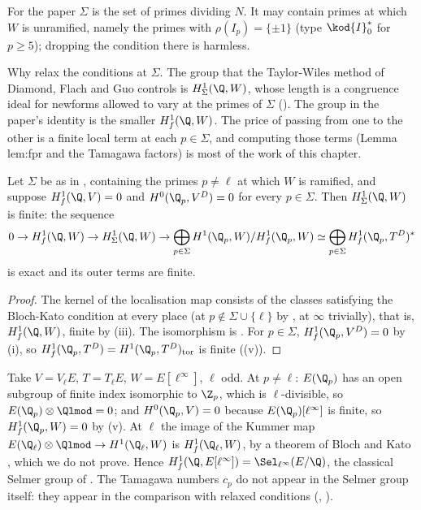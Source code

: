 For the paper $\Sigma$ is the set of primes dividing $N$. It may contain primes at which $W$ is unramified, namely the primes with $\rho(I_p)=\{\pm1\}$ (type
$\kod{I}_0^*$ for $p\ge5$); dropping the condition there is harmless.

Why relax the conditions at $\Sigma$. The group that the Taylor-Wiles method of Diamond, Flach and Guo controls is $H^1_\Sigma(\Q,W)$, whose length is a congruence
ideal for newforms allowed to vary at the primes of $\Sigma$ (). The group in the paper's identity is the smaller $H^1_f(\Q,W)$. The price of
passing from one to the other is a finite local term at each $p\in\Sigma$, and computing those terms (Lemma lem:fpr and the Tamagawa factors) is most of the work of
this chapter.

\begin{proposition}\label{prop:blochkato:sigma-finite}
Let $\Sigma$ be as in , containing the primes $p\ne\ell$ at which $W$ is ramified, and suppose $H^1_f(\Q,V)=0$ and $H^0(\Q_p,V^D)=0$ for every
$p\in\Sigma$. Then $H^1_\Sigma(\Q,W)$ is finite: the sequence
\[
0\to H^1_f(\Q,W)\to H^1_\Sigma(\Q,W)\to\bigoplus_{p\in\Sigma}H^1(\Q_p,W)/H^1_f(\Q_p,W)\simeq\bigoplus_{p\in\Sigma}H^1_f(\Q_p,T^D)^*
\]
is exact and its outer terms are finite.
\end{proposition}

\begin{proof}
The kernel of the localisation map consists of the classes satisfying the Bloch-Kato condition at every place (at $p\notin\Sigma\cup\{\ell\}$ by ,
at $\infty$ trivially), that is, $H^1_f(\Q,W)$, finite by (iii). The isomorphism is . For $p\in\Sigma$,
$H^1_f(\Q_p,V^D)=0$ by (i), so $H^1_f(\Q_p,T^D)=H^1(\Q_p,T^D)_{\mathrm{tor}}$ is finite ((v)).
\end{proof}

\begin{example}\label{ex:blochkato:classical-selmer}
Take $V=V_\ell E$, $T=T_\ell E$, $W=E[\ell^\infty]$, $\ell$ odd. At $p\ne\ell$: $E(\Q_p)$ has an open subgroup of finite index isomorphic to $\Z_p$, which is $\ell$-divisible, so
$E(\Q_p)\otimes\Qlmod=0$; and $H^0(\Q_p,V)=0$ because $E(\Q_p)[\ell^\infty]$ is finite, so $H^1_f(\Q_p,W)=0$ by (v). At $\ell$ the image of the
Kummer map $E(\Q_\ell)\otimes\Qlmod\to H^1(\Q_\ell,W)$ is $H^1_f(\Q_\ell,W)$, by a theorem of Bloch and Kato \cite[Section 3]{BlochKato}, which we do not prove. Hence
$H^1_f(\Q,E[\ell^\infty])=\Sel_{\ell^\infty}(E/\Q)$, the classical Selmer group of . The Tamagawa numbers $c_p$ do not appear in the Selmer group itself:
they appear in the comparison with relaxed conditions (, ).
\end{example}

